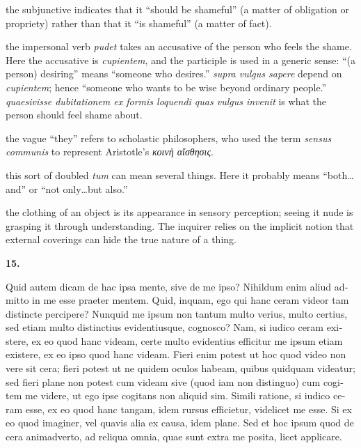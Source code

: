  the subjunctive indicates that it ``should be shameful'' (a matter of obligation or propriety) rather than that it ``is shameful'' (a matter of fact).

 the impersonal verb \textit{pudet} takes an accusative of the person who feels the shame. Here the accusative is \textit{cupientem}, and the participle is used in a generic sense: ``(a person) desiring'' means ``someone who desires.'' \textit{supra vulgus sapere} depend on \textit{cupientem}; hence ``someone who wants to be wise beyond ordinary people.'' \textit{quaesivisse dubitationem ex formis loquendi quas vulgus invenit} is what the person should feel shame about.

 the vague ``they'' refers to scholastic philosophers, who used the term \textit{sensus communis} to represent Aristotle's \textit{κοινὴ αἴσθησις}.

 this sort of doubled \textit{tum} can mean several things. Here it probably means ``both\dots and'' or ``not only\dots but also.''

 the clothing of an object is its appearance in sensory perception; seeing it nude is grasping it through understanding. The inquirer relies on the implicit notion that external coverings can hide the true nature of a thing.

\clearpage

\beginnumbering
\pstart
    \textbf{15.} \begin{latin}Quid autem dicam de hac ipsa mente, sive de me ipso? Nihildum enim aliud admitto in me esse praeter mentem. Quid, inquam, ego qui hanc ceram videor tam distincte percipere? Nunquid me ipsum non tantum multo verius, multo certius, sed etiam multo distinctius evidentiusque, cognosco? Nam, si iudico ceram existere, ex eo quod hanc videam, certe multo evidentius efficitur me ipsum etiam existere, ex eo ipso quod hanc videam. Fieri enim potest ut hoc quod video non vere sit cera; fieri potest ut ne quidem oculos habeam, quibus quidquam videatur; sed fieri plane non potest cum videam sive (quod iam non distinguo) cum cogitem me videre, ut ego ipse cogitans non aliquid sim. Simili ratione, si iudico ceram esse, ex eo quod hanc tangam, idem rursus efficietur, videlicet me esse. Si ex eo quod imaginer, vel quavis alia ex causa, idem plane. Sed et hoc ipsum quod de cera animadverto, ad reliqua omnia, quae sunt extra me posita, licet applicare.\end{latin}
\pend
\endnumbering

